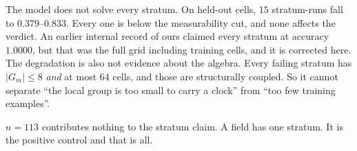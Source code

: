 The model does not solve every stratum. On held-out cells, $15$ stratum-runs fall to
$0.379$--$0.833$. Every one is below the measurability cut, and none affects the verdict. An
earlier internal record of ours claimed every stratum at accuracy $1.0000$, but that was the
full grid including training cells, and it is corrected here. The degradation is also not
evidence about the algebra. Every failing stratum has $|G_{m}| \le 8$ \emph{and} at most $64$
cells, and those are structurally coupled. So it cannot separate ``the local group is too
small to carry a clock'' from ``too few training examples''.

$n = 113$ contributes nothing to the stratum claim. A field has one stratum. It is
the positive control and that is all.
